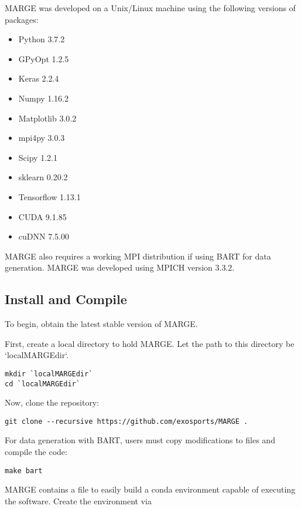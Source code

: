 \documentclass[letterpaper, 12pt]{article}
\begin{document}
\noindent MARGE was developed on a Unix/Linux machine using the following 
versions of packages:

\begin{itemize}
\item Python 3.7.2
\item GPyOpt 1.2.5
\item Keras 2.2.4
\item Numpy 1.16.2
\item Matplotlib 3.0.2
\item mpi4py 3.0.3
\item Scipy 1.2.1
\item sklearn 0.20.2
\item Tensorflow 1.13.1
\item CUDA 9.1.85
\item cuDNN 7.5.00
\end{itemize}

\noindent MARGE also requires a working MPI distribution if using BART for 
data generation.  MARGE was developed using MPICH version 3.3.2.



\subsection{Install and Compile}
\label{sec:install}

\noindent To begin, obtain the latest stable version of MARGE.  

\noindent First, create a local directory to hold MARGE.  Let the path to this directory 
be `localMARGEdir`.

\begin{verbatim}
mkdir `localMARGEdir`
cd `localMARGEdir`
\end{verbatim}

\noindent Now, clone the repository:
\begin{verbatim}
git clone --recursive https://github.com/exosports/MARGE .
\end{verbatim}

\noindent For data generation with BART, users must copy modifications to files
and compile the code:

\begin{verbatim}
make bart
\end{verbatim}

\noindent MARGE contains a file to easily build a conda environment capable of 
executing the software.  Create the environment via
\end{document}
